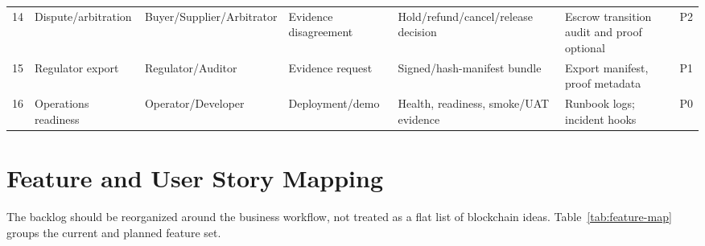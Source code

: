 \documentclass[conference]{IEEEtran}
\begin{document}
\begin{table}[t]
\begin{tabularx}{\textwidth}{P{.5cm} P{2.4cm} P{2.2cm} P{3.2cm} P{3.2cm} P{2.5cm} P{1.4cm}}
14 & Dispute/arbitration & Buyer/Supplier/Arbitrator & Evidence disagreement & Hold/refund/cancel/release decision & Escrow transition audit and proof optional & P2 \\
15 & Regulator export & Regulator/Auditor & Evidence request & Signed/hash-manifest bundle & Export manifest, proof metadata & P1 \\
16 & Operations readiness & Operator/Developer & Deployment/demo & Health, readiness, smoke/UAT evidence & Runbook logs; incident hooks & P0 \\
\bottomrule
\end{tabularx}
\end{table}

\section{Feature and User Story Mapping}
The backlog should be reorganized around the business workflow, not treated as a flat list of blockchain ideas. Table~\ref{tab:feature-map} groups the current and planned feature set.
\end{document}
